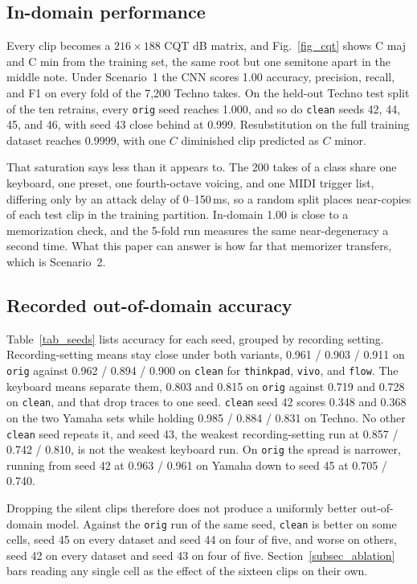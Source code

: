 \documentclass[pdflatex,sn-mathphys-num,iicol]{sn-jnl}
\begin{document}
\subsection{In-domain performance}\label{subsec_res_indomain}

Every clip becomes a $216 \times 188$ CQT dB matrix, and Fig.~\ref{fig_cqt} shows C maj and C min from the training set, the same root but one semitone apart in the middle note. Under Scenario~1 the CNN scores 1.00 accuracy, precision, recall, and F1 on every fold of the 7{,}200 Techno takes. On the held-out Techno test split of the ten retrains, every \texttt{orig} seed reaches 1.000, and so do \texttt{clean} seeds 42, 44, 45, and 46, with seed 43 close behind at 0.999. Resubstitution on the full training dataset reaches 0.9999, with one $C$ diminished clip predicted as $C$ minor.

That saturation says less than it appears to. The 200 takes of a class share one keyboard, one preset, one fourth-octave voicing, and one MIDI trigger list, differing only by an attack delay of 0--150\,ms, so a random split places near-copies of each test clip in the training partition. In-domain 1.00 is close to a memorization check, and the 5-fold run measures the same near-degeneracy a second time. What this paper can answer is how far that memorizer transfers, which is Scenario~2.

\subsection{Recorded out-of-domain accuracy}\label{subsec_res_recorded}

Table~\ref{tab_seeds} lists accuracy for each seed, grouped by recording setting. Recording-setting means stay close under both variants, 0.961 / 0.903 / 0.911 on \texttt{orig} against 0.962 / 0.894 / 0.900 on \texttt{clean} for \texttt{thinkpad}, \texttt{vivo}, and \texttt{flow}. The keyboard means separate them, 0.803 and 0.815 on \texttt{orig} against 0.719 and 0.728 on \texttt{clean}, and that drop traces to one seed. \texttt{clean} seed 42 scores 0.348 and 0.368 on the two Yamaha sets while holding 0.985 / 0.884 / 0.831 on Techno. No other \texttt{clean} seed repeats it, and seed 43, the weakest recording-setting run at 0.857 / 0.742 / 0.810, is not the weakest keyboard run. On \texttt{orig} the spread is narrower, running from seed 42 at 0.963 / 0.961 on Yamaha down to seed 45 at 0.705 / 0.740.

Dropping the silent clips therefore does not produce a uniformly better out-of-domain model. Against the \texttt{orig} run of the same seed, \texttt{clean} is better on some cells, seed 45 on every dataset and seed 44 on four of five, and worse on others, seed 42 on every dataset and seed 43 on four of five. Section~\ref{subsec_ablation} bars reading any single cell as the effect of the sixteen clips on their own.
\end{document}
